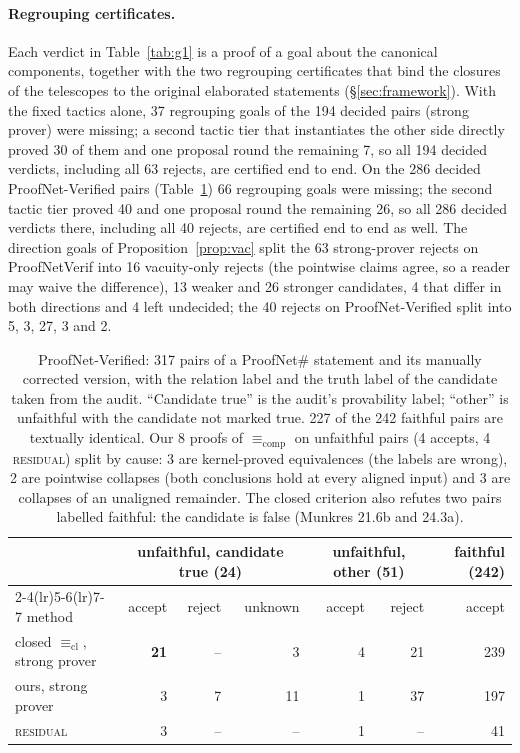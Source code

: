 \documentclass[10pt]{article}
\theoremstyle{definition}
\newcommand{\Ecl}{\mathrel{\equiv_{\mathrm{cl}}}}
\newcommand{\Ecomp}{\mathrel{\equiv_{\mathrm{comp}}}}
\newcommand{\V}[1]{\textsc{#1}}
\begin{document}
\paragraph{Regrouping certificates.} Each verdict in Table~\ref{tab:g1}
is a proof of a goal about the canonical components, together with the two regrouping
certificates that bind the closures of the telescopes to the original elaborated statements
(\S\ref{sec:framework}). With the fixed tactics alone, 37 regrouping goals of the 194 decided pairs (strong prover)
were missing; a second tactic tier that instantiates the other side directly proved 30 of
them and one proposal round the remaining 7, so all 194 decided verdicts, including all
63 rejects, are certified end to end. On the 286 decided ProofNet-Verified pairs
(Table~\ref{tab:g4}) 66 regrouping goals were missing; the second tactic tier proved 40 and
one proposal round the remaining 26, so all 286 decided verdicts there, including all 40
rejects, are certified end to end as well.
The direction goals of Proposition~\ref{prop:vac} split the 63 strong-prover rejects on
ProofNetVerif into 16 vacuity-only rejects (the pointwise claims agree, so a reader may waive
the difference), 13 weaker and 26 stronger candidates, 4 that differ in both directions and 4
left undecided; the 40 rejects on ProofNet-Verified split into 5, 3, 27, 3 and 2.

\begin{table}[t]
\centering\small
\begin{tabular}{lrrrrrr}
\toprule
& \multicolumn{3}{c}{unfaithful, candidate true (24)} & \multicolumn{2}{c}{unfaithful, other (51)} & faithful (242)\\
\cmidrule(lr){2-4}\cmidrule(lr){5-6}\cmidrule(lr){7-7}
method & accept & reject & unknown & accept & reject & accept\\
\midrule
closed $\Ecl$, strong prover & \textbf{21} & -- & 3 & 4 & 21 & 239\\
ours, strong prover & 3 & 7 & 11 & 1 & 37 & 197\\
\quad \V{residual} & 3 & -- & -- & 1 & -- & 41\\
\bottomrule
\end{tabular}
\caption{ProofNet-Verified: 317 pairs of a ProofNet\# statement and its manually corrected
version, with the relation label and the truth label of the candidate taken from the audit.
``Candidate true'' is the audit's provability label; ``other'' is unfaithful with the candidate
not marked true. 227 of the 242 faithful pairs are textually identical. Our 8 proofs of
$\Ecomp$ on unfaithful pairs (4 accepts, 4 \V{residual}) split by cause: 3 are kernel-proved
equivalences (the labels are wrong), 2 are pointwise collapses (both conclusions hold at every
aligned input) and 3 are collapses of an unaligned remainder. The closed criterion also refutes two
pairs labelled faithful: the candidate is false (Munkres 21.6b and 24.3a).}
\label{tab:g4}
\end{table}
\end{document}

